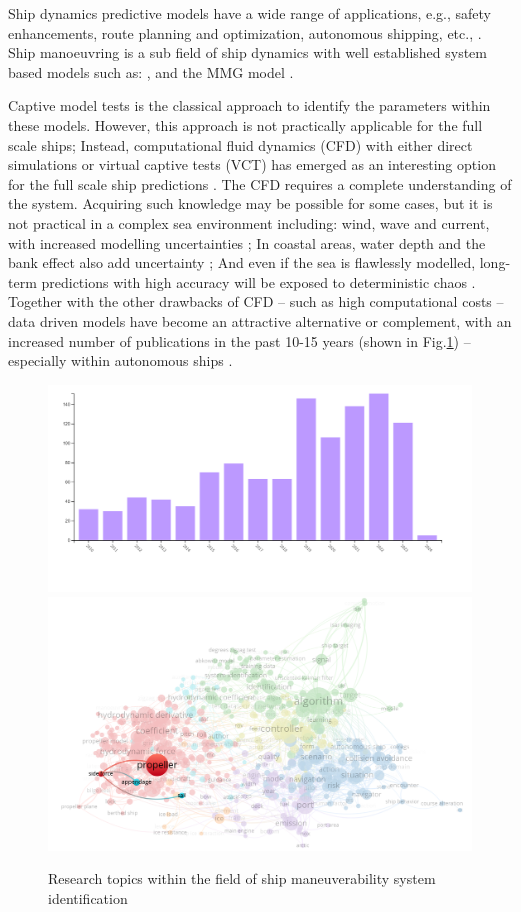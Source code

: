Ship dynamics predictive models have a wide range of applications, e.g., safety enhancements, route planning and optimization, autonomous shipping, etc., \citep{aslam_internet_2020}.
Ship manoeuvring is a sub field of ship dynamics with well established system based models such as: \citet{abkowitz_ship_1964,nomoto_steering_1957,norrbin_theory_1971}, and the MMG model \citep{yasukawa_introduction_2015}.

Captive model tests is the classical approach to identify the parameters within these models. However, this approach is not practically applicable for the full scale ships; Instead, computational fluid dynamics (CFD) with either direct simulations or virtual captive tests (VCT) has emerged as an interesting option for the full scale ship predictions \citep{liu_predictions_2018,li_ship_2022}.
The CFD requires a complete understanding of the system. Acquiring such knowledge may be possible for some cases, but it is not practical in a complex sea environment including: wind, wave and current, with increased modelling uncertainties \citep{miller_ship_2021}; In coastal areas, water depth and the bank effect also add uncertainty  \citep{nielsen_machine_2022};
And even if the sea is flawlessly modelled, long-term predictions with high accuracy will be exposed to deterministic chaos \citep{lorenz_deterministic_1963}.
Together with the other drawbacks of CFD -- such as high computational costs -- data driven models have become an attractive alternative or complement, with an increased number of publications in the past 10-15 years (shown in Fig.\ref{fig:pub_overview}) -- especially within autonomous ships \citep{ahmed_survey_2023}.
%
\begin{figure}[h]
  \includegraphics[width=.5\textwidth]{figures/trendinyear.jpg}
  \includegraphics[width=.5\textwidth]{figures/wind_drift_research.png}
  \caption{Research topics within the field of ship maneuverability system identification}
  \label{fig:pub_overview}
\end{figure}
%

